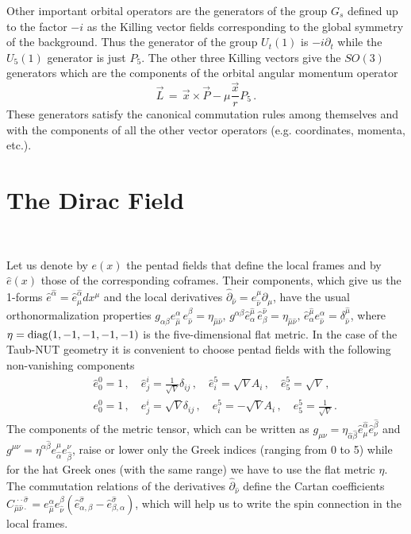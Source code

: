 \documentclass[a4paper,12pt]{article}
\begin{document}
Other important orbital operators are the generators of the group $G_{s}$ 
defined up to the factor $-i$ as  the Killing vector fields corresponding to 
the global symmetry of the background. Thus the generator of the group 
$U_{t}(1)$ is $-i\partial_{t}$ while the $U_{5}(1)$ generator is just $P_{5}$.  
The other three Killing vectors give the $SO(3)$ generators 
which are the components of the orbital angular momentum operator 
\begin{equation}\label{(angmom)}
\vec{L}\,=\,\vec{x}\times\vec{P}-\mu\frac{\vec{x}}{r}P_{5}\,.
\end{equation} 
These generators  satisfy the canonical commutation rules 
among themselves and with the components of all the other vector operators 
(e.g. coordinates,  momenta, etc.). 



\section{The Dirac Field}
\

Let us denote by  $e(x)$ the  pentad fields that define the local frames and by 
$\hat e(x)$ those of the corresponding coframes. Their components, which give 
us the 
1-forms $\hat e^{\hat\alpha}=\hat e^{\hat\alpha}_{\mu}dx^{\mu}$ and 
the local derivatives  
$\hat\partial_{\hat\nu}=e^{\mu}_{\hat\nu}\partial_{\mu}$,  
have the usual orthonormalization properties 
$g_{\alpha\beta} e_{\hat\mu}^{\alpha}\, e_{\hat\nu}^{\beta}=
\eta_{\hat\mu \hat\nu},\, 
g^{\alpha\beta} \hat e^{\hat\mu}_{\alpha}\, \hat e^{\hat\nu}_{\beta}=
\eta_{\hat\mu \hat\nu},\, 
\hat e^{\hat\mu}_{\alpha} e^{\alpha}_{\hat\nu}=\delta^{\hat\mu}_{\hat\nu}$, 
where $\eta={\rm diag}(1,-1,-1,-1,-1)$ is the five-dimensional flat metric. 
In the case of the Taub-NUT geometry it is convenient to choose pentad 
fields with the following non-vanishing components \cite{P}
\begin{eqnarray}
&&\hat e^{0}_{0}=1\,, \quad
\hat e^{i}_{j}=\frac{1}{\sqrt{V}}\delta_{ij}\,, \quad
\hat e^{5}_{i}=\sqrt{V}A_{i}\,, \quad
\hat e^{5}_{5}=\sqrt{V}\,, \label{he}\\
&&e^{0}_{0}=1\,,\quad
e^{i}_{j}=\sqrt{V}\delta_{ij}\,,\quad
e^{5}_{i}=-\sqrt{V}A_{i}\,,\quad
e^{5}_{5}=\frac{1}{\sqrt{V}}\,.\label{e}
\end{eqnarray}
The components of the metric tensor, which can be written as  
$g_{\mu\nu}=\eta_{\hat\alpha \hat\beta}\hat e^{\hat\alpha}_{\mu}
\hat e^{\hat\beta}_{\nu}$ and 
$g^{\mu\nu}=\eta^{\hat\alpha \hat\beta} e_{\hat\alpha}^{\mu}
e_{\hat\beta}^{\nu}$,  raise or lower only the Greek 
indices (ranging from 0 to 5) while for the hat Greek ones 
(with the same range) we have to use the flat metric $\eta$. 
The commutation relations of the derivatives  
$\hat\partial_{\hat\nu}$ define the Cartan coefficients  
$C^{\,\cdot\cdot\,\hat\sigma}_{\hat\mu\hat\nu\cdot}=
e_{\hat\mu}^{\alpha} e_{\hat\nu}^{\beta}(\hat e^{\hat\sigma}_{\alpha,\beta}-
\hat e^{\hat\sigma}_{\beta,\alpha})$,
which will help us to write the spin connection in the local frames. 
   
\end{document}
